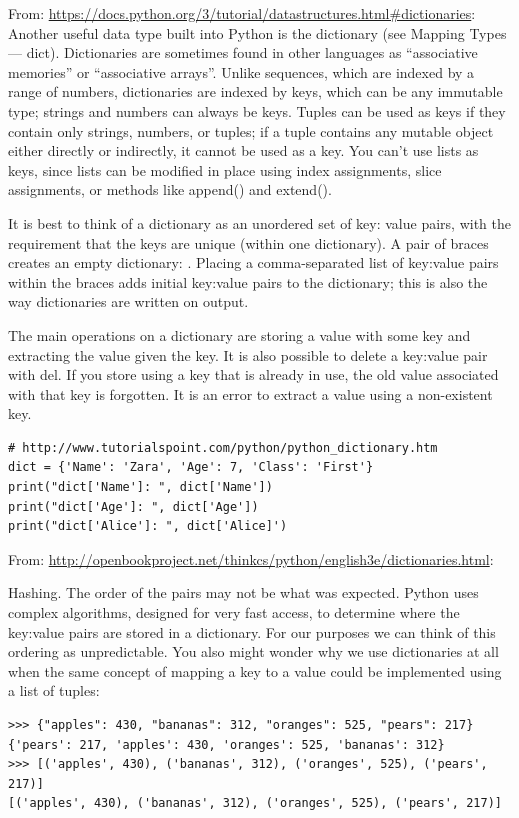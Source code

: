 \documentclass[11pt,a4paper]{article}
\begin{document}
From: \href{https://docs.python.org/3/tutorial/datastructures.html\#dictionaries}{https://docs.python.org/3/tutorial/datastructures.html\#dictionaries}: 
Another useful data type built into Python is the dictionary (see
Mapping Types — dict). Dictionaries are sometimes found in other
languages as “associative memories” or “associative arrays”. Unlike
sequences, which are indexed by a range of numbers, dictionaries are
indexed by keys, which can be any immutable type; strings and numbers
can always be keys. Tuples can be used as keys if they contain only
strings, numbers, or tuples; if a tuple contains any mutable object
either directly or indirectly, it cannot be used as a key. You can’t
use lists as keys, since lists can be modified in place using index
assignments, slice assignments, or methods like append() and extend().

It is best to think of a dictionary as an unordered set of key: value
pairs, with the requirement that the keys are unique (within one
dictionary). A pair of braces creates an empty dictionary: {}. Placing
a comma-separated list of key:value pairs within the braces adds
initial key:value pairs to the dictionary; this is also the way
dictionaries are written on output.

The main operations on a dictionary are storing a value with some key
and extracting the value given the key. It is also possible to delete
a key:value pair with del. If you store using a key that is already in
use, the old value associated with that key is forgotten. It is an
error to extract a value using a non-existent key.

\begin{lstlisting}
# http://www.tutorialspoint.com/python/python_dictionary.htm
dict = {'Name': 'Zara', 'Age': 7, 'Class': 'First'}
print("dict['Name']: ", dict['Name'])
print("dict['Age']: ", dict['Age'])
print("dict['Alice']: ", dict['Alice]')
\end{lstlisting}

\noindent
From: \href{http://openbookproject.net/thinkcs/python/english3e/dictionaries.html}{http://openbookproject.net/thinkcs/python/english3e/dictionaries.html}:

Hashing. The order of the pairs may not be what was expected. Python uses complex algorithms, designed for very fast access, to determine where the key:value pairs are stored in a dictionary. For our purposes we can think of this ordering as unpredictable.
You also might wonder why we use dictionaries at all when the same concept of mapping a key to a value could be implemented using a list of tuples:
\begin{lstlisting}
>>> {"apples": 430, "bananas": 312, "oranges": 525, "pears": 217}
{'pears': 217, 'apples': 430, 'oranges': 525, 'bananas': 312}
>>> [('apples', 430), ('bananas', 312), ('oranges', 525), ('pears', 217)]
[('apples', 430), ('bananas', 312), ('oranges', 525), ('pears', 217)]
\end{lstlisting}
\end{document}
